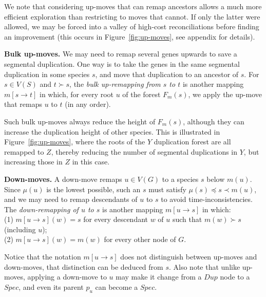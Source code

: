 \documentclass[10pt]{article}
\begin{document}
We note that considering up-moves that can remap ancestors allows a much more efficient exploration than restricting to moves that cannot.  If only the latter were allowed, we may be forced into a valley of high-cost reconciliations before finding an improvement (this occurs in Figure~\ref{fig:up-moves}, see appendix for details).



\medskip 

\noindent
\textbf{Bulk up-moves.}  We may need to remap several genes upwards to save a segmental duplication.  One way is to take the genes in the same segmental duplication in some species $s$, and move that duplication to an ancestor of $s$.
For $s \in V(S)$ and $t \succ s$, the \emph{bulk up-remapping from $s$ to $t$}
is another mapping $m[s \rightarrow t]$ in which, for every root $u$ of the forest $F_m(s)$, we apply the up-move that remaps $u$ to $t$ (in any order).  



Such bulk up-moves always reduce the height of $F_m(s)$, although they can increase
the duplication height of other species.  
This is illustrated in Figure~\ref{fig:up-moves}, where the roots of the $Y$ duplication forest are all remapped to $Z$, thereby reducing the number of segmental duplications in $Y$, but increasing those in $Z$ in this case.  






\medskip 

\noindent 
\textbf{Down-moves.}
A down-move remaps $u \in V(G)$ to a species $s$ below $m(u)$.  Since $\mu(u)$ is the lowest possible, such an $s$ must satisfy $\mu(s) \preceq s \prec m(u)$, and we may need to remap descendants of $u$ to $s$ to avoid time-inconsistencies.
The \emph{down-remapping of $u$ to $s$} is another mapping $m[u \rightarrow s]$ in which: \\
(1) $m[u \rightarrow s](w) = s$ for every descendant $w$ of $u$ such that $m(w) \succ s$ (including $u$);\\
(2) $m[u \rightarrow s](w) = m(w)$ for every other node of $G$.
    


Notice that the notation $m[u \rightarrow s]$ does not distinguish between up-moves and down-moves, that distinction can be deduced from $s$.
Also note that unlike up-moves, applying a down-move to $u$ may make it change from a $Dup$ node to a $Spec$, and even its parent $p_u$ can become a $Spec$.
\end{document}
